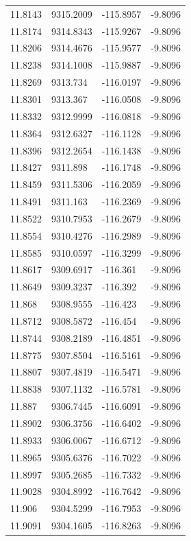 \begin{table}[H]
\begin{tabular}{llll}
11.8143 & 9315.2009 & -115.8957 & -9.8096 \\
11.8174 & 9314.8343 & -115.9267 & -9.8096 \\
11.8206 & 9314.4676 & -115.9577 & -9.8096 \\
11.8238 & 9314.1008 & -115.9887 & -9.8096 \\
11.8269 & 9313.734 & -116.0197 & -9.8096 \\
11.8301 & 9313.367 & -116.0508 & -9.8096 \\
11.8332 & 9312.9999 & -116.0818 & -9.8096 \\
11.8364 & 9312.6327 & -116.1128 & -9.8096 \\
11.8396 & 9312.2654 & -116.1438 & -9.8096 \\
11.8427 & 9311.898 & -116.1748 & -9.8096 \\
11.8459 & 9311.5306 & -116.2059 & -9.8096 \\
11.8491 & 9311.163 & -116.2369 & -9.8096 \\
11.8522 & 9310.7953 & -116.2679 & -9.8096 \\
11.8554 & 9310.4276 & -116.2989 & -9.8096 \\
11.8585 & 9310.0597 & -116.3299 & -9.8096 \\
11.8617 & 9309.6917 & -116.361 & -9.8096 \\
11.8649 & 9309.3237 & -116.392 & -9.8096 \\
11.868 & 9308.9555 & -116.423 & -9.8096 \\
11.8712 & 9308.5872 & -116.454 & -9.8096 \\
11.8744 & 9308.2189 & -116.4851 & -9.8096 \\
11.8775 & 9307.8504 & -116.5161 & -9.8096 \\
11.8807 & 9307.4819 & -116.5471 & -9.8096 \\
11.8838 & 9307.1132 & -116.5781 & -9.8096 \\
11.887 & 9306.7445 & -116.6091 & -9.8096 \\
11.8902 & 9306.3756 & -116.6402 & -9.8096 \\
11.8933 & 9306.0067 & -116.6712 & -9.8096 \\
11.8965 & 9305.6376 & -116.7022 & -9.8096 \\
11.8997 & 9305.2685 & -116.7332 & -9.8096 \\
11.9028 & 9304.8992 & -116.7642 & -9.8096 \\
11.906 & 9304.5299 & -116.7953 & -9.8096 \\
11.9091 & 9304.1605 & -116.8263 & -9.8096 \\

\end{tabular}
\end{table}
